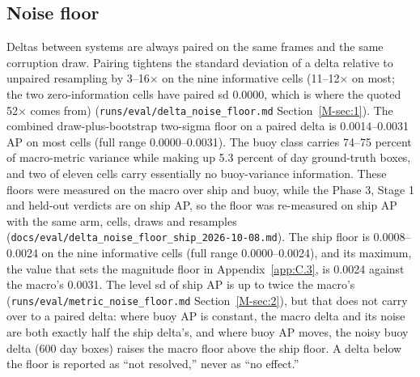\documentclass[journal,onecolumn]{IEEEtran}
\begin{document}
\subsection{Noise floor}\label{app:C.2}
Deltas between systems are always paired on the same frames and the same corruption draw. Pairing tightens the standard deviation of a delta relative to unpaired resampling by 3--16$\times$ on the nine informative cells (11--12$\times$ on most; the two zero-information cells have paired sd 0.0000, which is where the quoted 52$\times$ comes from) (\texttt{runs/\allowbreak{}eval/\allowbreak{}delta\_\allowbreak{}noise\_\allowbreak{}floor.md} Section~\ref{M-sec:1}). The combined draw-plus-bootstrap two-sigma floor on a paired delta is 0.0014--0.0031 AP on most cells (full range 0.0000--0.0031). The buoy class carries 74--75 percent of macro-metric variance while making up 5.3 percent of day ground-truth boxes, and two of eleven cells carry essentially no buoy-variance information. These floors were measured on the macro over ship and buoy, while the Phase 3, Stage 1 and held-out verdicts are on ship AP, so the floor was re-measured on ship AP with the same arm, cells, draws and resamples (\texttt{docs/\allowbreak{}eval/\allowbreak{}delta\_\allowbreak{}noise\_\allowbreak{}floor\_\allowbreak{}ship\_\allowbreak{}2026-\allowbreak{}10-\allowbreak{}08.md}). The ship floor is 0.0008--0.0024 on the nine informative cells (full range 0.0000--0.0024), and its maximum, the value that sets the magnitude floor in Appendix~\ref{app:C.3}, is 0.0024 against the macro's 0.0031. The level sd of ship AP is up to twice the macro's (\texttt{runs/\allowbreak{}eval/\allowbreak{}metric\_\allowbreak{}noise\_\allowbreak{}floor.md} Section~\ref{M-sec:2}), but that does not carry over to a paired delta: where buoy AP is constant, the macro delta and its noise are both exactly half the ship delta's, and where buoy AP moves, the noisy buoy delta (600 day boxes) raises the macro floor above the ship floor. A delta below the floor is reported as ``not resolved,'' never as ``no effect.''
\end{document}
